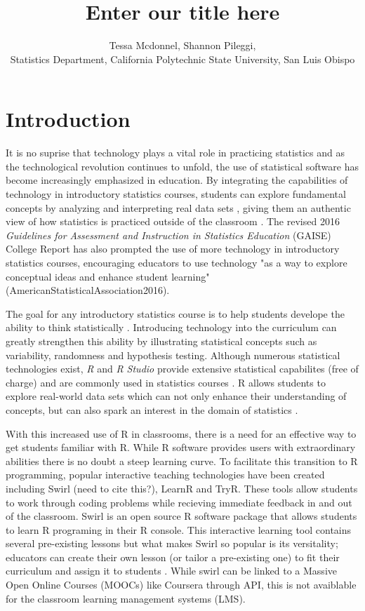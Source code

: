 \documentclass{tise_style}
\title{Enter our title here}
\author{Tessa Mcdonnel, Shannon Pileggi,  \\Statistics Department, California Polytechnic State University, San Luis Obispo}
\begin{document}
\maketitle

\section{Introduction}


It is no suprise that technology plays a vital role in practicing statistics and as the technological revolution continues to
unfold, the use of statistical software has become increasingly emphasized in education. By integrating the
capabilities of technology in introductory statistics courses, students can explore fundamental concepts by analyzing and
interpreting real data sets \citep{Chance2007}, giving them an authentic view of how statistics is practiced outside of the
classroom \citep{Wang2017}. The revised 2016 \textit{Guidelines for Assessment and Instruction in Statistics Education}
(GAISE) College Report has also prompted the use of more technology in introductory statistics courses, encouraging educators
to use technology "as a way to explore conceptual ideas and enhance student learning" (AmericanStatisticalAssociation2016).

The goal for any introductory statistics course is to help students develope the ability to think statistically
\citep{AmericanStatisticalAssociation2016}.
Introducing technology into the curriculum can greatly strengthen this ability by illustrating statistical concepts such as
variability, randomness and hypothesis testing. Although numerous statistical technologies exist, \textit{R} and \textit{R Studio}
provide extensive statistical capabilites (free of charge) and are commonly used in statistics courses \citep{Chance2007}. R
allows students to explore real-world data sets which can not only enhance their understanding of concepts, but can also spark
an interest in the domain of statistics \citep{Wang2017}.

With this increased use of R in classrooms, there is a need for an effective way to get students familiar with R. While R
software provides users with extraordinary abilities there is no doubt a steep learning curve. To facilitate this transition
to R programming, popular interactive teaching technologies have been created including Swirl (need to cite this?), LearnR
and TryR. These tools
allow students to work through coding problems while recieving immediate feedback in and out of the classroom. Swirl is an
open source R software package that allows students to learn R programing in their R console. This interactive learning tool
contains several pre-existing lessons but what makes Swirl so popular is its versitality; educators can create their own
lesson (or tailor a pre-existing one) to fit their curriculum and assign it to students \citep{Carchedi2014}.
While swirl can be linked to a Massive Open Online Courses (MOOCs) like Coursera through API, this is not avaiblable for the classroom
learning management systems (LMS).
\end{document}
